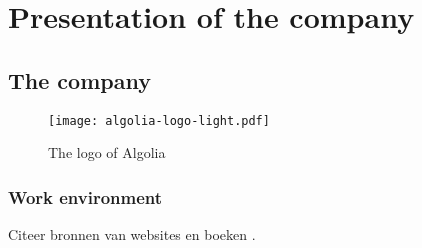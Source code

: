 
\section{Presentation of the company} %
\label{sec:presentation}

\subsection{The company} %
\label{sub:company}

\lipsum[1]

\begin{figure}[H]
  \label{figure:company-logo}
  \centering
  \texttt{[image: algolia-logo-light.pdf]}
  \caption{The logo of Algolia \cite{voorbeeld-ref}}
\end{figure}

\subsubsection{Work environment}
\label{sub:work-environment}

Citeer bronnen van websites \cite{voorbeeld-ref} en boeken \cite{boek-ref}.

\lipsum[1]

